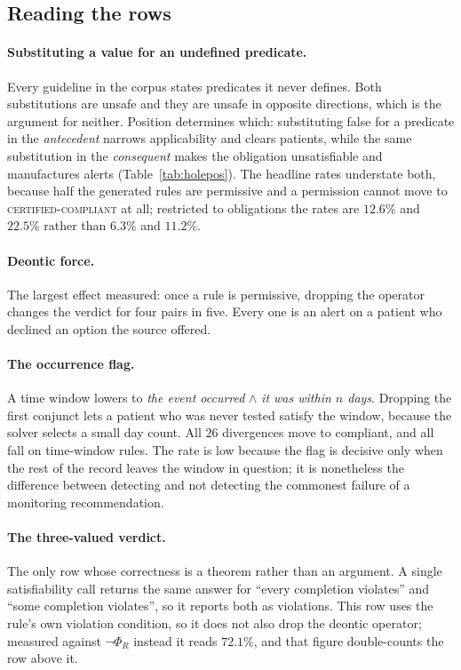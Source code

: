 \subsection{Reading the rows}

\paragraph{Substituting a value for an undefined predicate.}
Every guideline in the corpus states predicates it never defines. Both
substitutions are unsafe and they are unsafe in opposite directions, which is
the argument for neither. Position determines which: substituting
\textsf{false} for a predicate in the \emph{antecedent} narrows applicability
and clears patients, while the same substitution in the \emph{consequent} makes
the obligation unsatisfiable and manufactures alerts
(Table~\ref{tab:holepos}). The headline rates understate both, because half the
generated rules are permissive and a permission cannot move to
\textsc{certified-compliant} at all; restricted to obligations the rates are
$12.6\%$ and $22.5\%$ rather than $6.3\%$ and $11.2\%$.

\paragraph{Deontic force.}
The largest effect measured: once a rule is permissive, dropping the operator
changes the verdict for four pairs in five. Every one is an alert on a patient
who declined an option the source offered.

\paragraph{The occurrence flag.}
A time window lowers to \emph{the event occurred} $\wedge$ \emph{it was within
$n$ days}. Dropping the first conjunct lets a patient who was never tested
satisfy the window, because the solver selects a small day count. All $26$
divergences move to compliant, and all fall on time-window rules. The rate is
low because the flag is decisive only when the rest of the record leaves the
window in question; it is nonetheless the difference between detecting and not
detecting the commonest failure of a monitoring recommendation.

\paragraph{The three-valued verdict.}
The only row whose correctness is a theorem rather than an argument. A single
satisfiability call returns the same answer for ``every completion violates''
and ``some completion violates'', so it reports both as violations. This row
uses the rule's own violation condition, so it does not also drop the deontic
operator; measured against $\neg\Phi_R$ instead it reads $72.1\%$, and that
figure double-counts the row above it.

